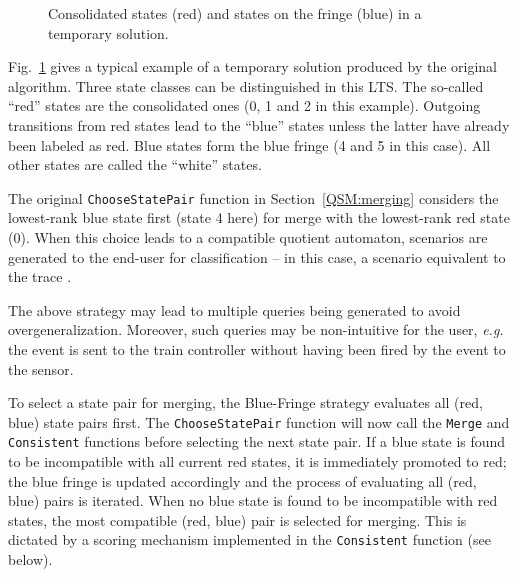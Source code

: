 \begin{figure}
\centering
{}
\caption{Consolidated states (red) and states on the fringe (blue) in a temporary solution\label{Fig:BlueFringe}.}
\end{figure}

Fig.~\ref{Fig:BlueFringe} gives a typical example of a temporary solution produced by the original algorithm. Three state classes can be distinguished in this LTS. The so-called ``red'' states are the consolidated ones (0, 1 and 2 in this example). Outgoing transitions from red states lead to the ``blue'' states unless the latter have already been labeled as red. Blue states form the blue fringe (4 and 5 in this case). All other states are called the ``white'' states. 

The original \texttt{ChooseStatePair} function in Section~\ref{QSM:merging} considers the lowest-rank blue state first (state 4 here) for merge with the lowest-rank red state (0). When this choice leads to a compatible quotient automaton, scenarios are generated to the end-user for classification -- in this case, a scenario equivalent to the trace . 

The above strategy may lead to multiple queries being generated to avoid overgeneralization. Moreover, such queries may be non-intuitive for the user, \textit{e.g.} the  event is sent to the train controller without having been fired by the  event to the sensor.

To select a state pair for merging, the Blue-Fringe strategy evaluates all (red, blue) state pairs first. The \texttt{ChooseStatePair} function will now call the \texttt{Merge} and \texttt{Consistent} functions before selecting the next state pair. If a blue state is found to be incompatible with all current red states, it is immediately promoted to red; the blue fringe is updated accordingly and the process of evaluating all (red, blue) pairs is iterated. When no blue state is found to be incompatible with red states, the most compatible (red, blue) pair is selected for merging. This is dictated by a scoring mechanism implemented in the \texttt{Consistent} function (see below).


